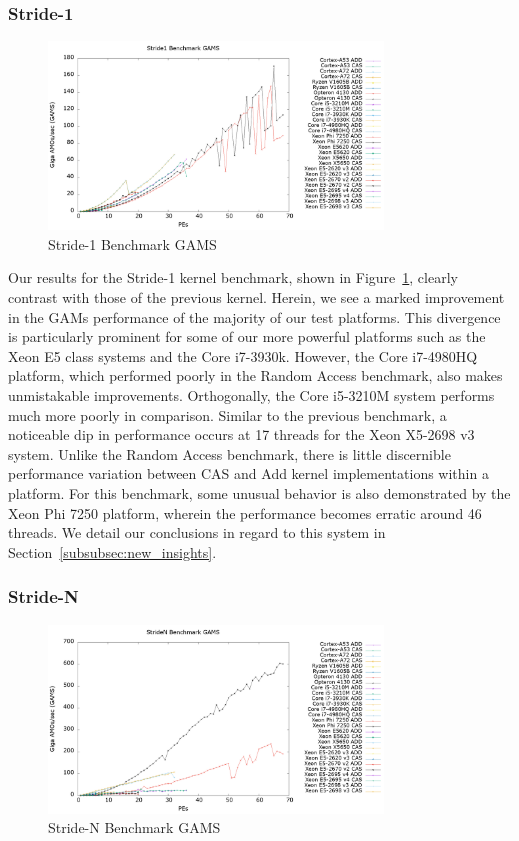 \subsubsection{Stride-1}
\label{subsubsec:stride1_res}

\begin{figure}[!t]
\centering
\includegraphics[width=3.5in]{figures/STRIDE1_GAMS.png}
\caption{Stride-1 Benchmark GAMS}
\label{fig:s1_gams}
\end{figure}

Our results for the Stride-1 kernel benchmark, shown in Figure~\ref{fig:s1_gams}, clearly contrast with those of the previous kernel.
Herein, we see a marked improvement in the GAMs performance of the majority of our test platforms.
This divergence is particularly prominent for some of our more powerful platforms such as the Xeon E5 class systems and the Core i7-3930k.
However, the Core i7-4980HQ platform, which performed poorly in the Random Access benchmark, also makes unmistakable improvements.
Orthogonally, the Core i5-3210M system performs much more poorly in comparison.
Similar to the previous benchmark, a noticeable dip in performance occurs at 17 threads for the Xeon X5-2698 v3 system.
Unlike the Random Access benchmark, there is little discernible performance variation between CAS and Add kernel implementations within a platform.
For this benchmark, some unusual behavior is also demonstrated by the Xeon Phi 7250 platform, wherein the performance becomes erratic around 46 threads.
We detail our conclusions in regard to this system in Section~\ref{subsubsec:new_insights}.

\subsubsection{Stride-N}
\label{subsubsec:striden_res}

\begin{figure}[!t]
\centering
\includegraphics[width=3.5in]{figures/STRIDEN_GAMS.png}
\caption{Stride-N Benchmark GAMS}
\label{fig:sn_gams}
\end{figure}

